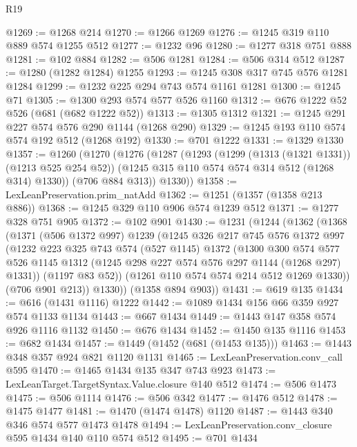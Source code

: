 \begin{lexlean}{R19}
\begin{coremodule}
@1269 := @1268 @214
@1270 := @1266 @1269
@1276 := @1245 @319 @110 @889 @574 @1255 @512
@1277 := @1232 @96
@1280 := @1277 @318 @751 @888
@1281 := @102 @884
@1282 := @506 @1281
@1284 := @506 @314 @512
@1287 := @1280 (@1282 @1284) @1255
@1293 := @1245 @308 @317 @745 @576 @1281 @1284
@1299 := @1232 @225 @294 @743 @574 @1161 @1281
@1300 := @1245 @71
@1305 := @1300 @293 @574 @577 @526 @1160
@1312 := @676 @1222 @52 @526 (@681 (@682 @1222 @52))
@1313 := @1305 @1312
@1321 := @1245 @291 @227 @574 @576 @290 @1144 (@1268 @290)
@1329 := @1245 @193 @110 @574 @574 @192 @512 (@1268 @192)
@1330 := @701 @1222
@1331 := @1329 @1330
@1357 := @1260
    (@1270
      (@1276
        (@1287
          (@1293
            (@1299 (@1313 (@1321 @1331)) (@1213 @525 @254 @52))
            (@1245 @315 @110 @574 @574 @314 @512 (@1268 @314) @1330))
          (@706 @884 @313))
        @1330))
@1358 := LexLeanPreservation.prim_natAdd
@1362 := @1251 (@1357 (@1358 @213 @886))
@1368 := @1245 @329 @110 @906 @574 @1239 @512
@1371 := @1277 @328 @751 @905
@1372 := @102 @901
@1430 := @1231
    (@1244
      (@1362
        (@1368
          (@1371
            (@506 @1372 @997)
            @1239
            (@1245
              @326
              @217
              @745
              @576
              @1372
              @997
              (@1232
                @223
                @325
                @743
                @574
                (@527 @1145)
                @1372
                (@1300
                  @300
                  @574
                  @577
                  @526
                  @1145
                  @1312
                  (@1245 @298 @227 @574 @576 @297 @1144 (@1268 @297) @1331))
                (@1197 @83 @52))
              (@1261 @110 @574 @574 @214 @512 @1269 @1330))
            (@706 @901 @213))
          @1330))
      (@1358 @894 @903))
@1431 := @619 @135
@1434 := @616 (@1431 @1116) @1222
@1442 := @1089 @1434 @156 @66 @359 @927 @574 @1133 @1134
@1443 := @667 @1434
@1449 := @1443 @147 @358 @574 @926 @1116 @1132
@1450 := @676 @1434
@1452 := @1450 @135 @1116
@1453 := @682 @1434
@1457 := @1449 (@1452 (@681 (@1453 @135)))
@1463 := @1443 @348 @357 @924 @821 @1120 @1131
@1465 := LexLeanPreservation.conv_call @595
@1470 := @1465 @1434 @135 @347 @743 @923
@1473 := LexLeanTarget.TargetSyntax.Value.closure @140 @512
@1474 := @506 @1473
@1475 := @506 @1114
@1476 := @506 @342
@1477 := @1476 @512
@1478 := @1475 @1477
@1481 := @1470 (@1474 @1478) @1120
@1487 := @1443 @340 @346 @574 @577 @1473 @1478
@1494 := LexLeanPreservation.conv_closure @595 @1434 @140 @110 @574 @512
@1495 := @701 @1434

\end{coremodule}
\end{lexlean}
